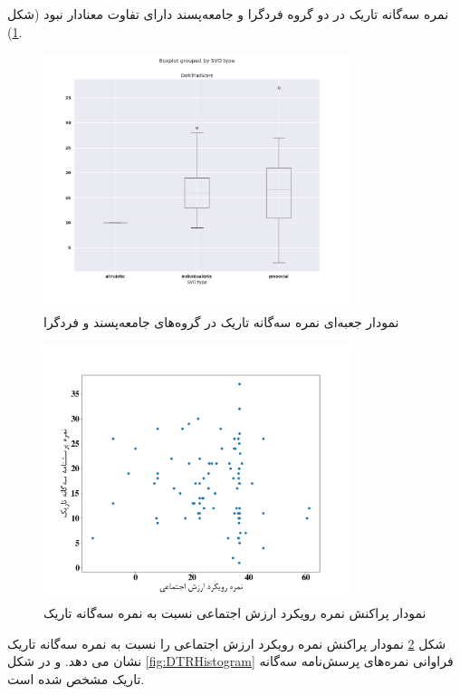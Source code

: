 نمره سه‌گانه تاریک در دو گروه  فرد‌گرا و جامعه‌پسند دارای تفاوت معنادار نبود
(شکل 
\ref{fig:BoxPlotDTRSVOTypeProsocialBoxPlotDTRSVOTypeIndivisualistTTESTIndPValueReport}).

\begin{figure}[htpb]
    \centering
    \includegraphics[width=0.8\textwidth]{./img/BoxPlotDTRSVOTypeProsocialBoxPlotDTRSVOTypeIndivisualistTTESTIndPValueReport.png}
    \caption{نمودار جعبه‌ای نمره سه‌گانه تاریک در گروه‌های جامعه‌پسند و فرد‌گرا}
    \label{fig:BoxPlotDTRSVOTypeProsocialBoxPlotDTRSVOTypeIndivisualistTTESTIndPValueReport}
\end{figure}

\begin{figure}[htpb]
    \centering
    \includegraphics[width=0.8\textwidth]{./img/ScatterSVOScoreDarkTriadScore.png}
    \caption{نمودار پراکنش نمره رویکرد ارزش اجتماعی  نسبت به نمره سه‌گانه تاریک}
    \label{fig:ScatterSVOScoreDarkTriadScore}
\end{figure}
شکل
\ref{fig:ScatterSVOScoreDarkTriadScore}
نمودار پراکنش نمره رویکرد ارزش اجتماعی را نسبت به نمره سه‌گانه تاریک نشان می دهد.
و در شکل
\ref{fig:DTRHistogram}
فراوانی نمره‌های پرسش‌نامه سه‌گانه تاریک مشخص شده است.

